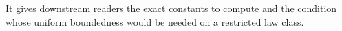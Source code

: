 It gives downstream readers the exact constants to compute and the condition whose uniform boundedness would be needed on a restricted law class.